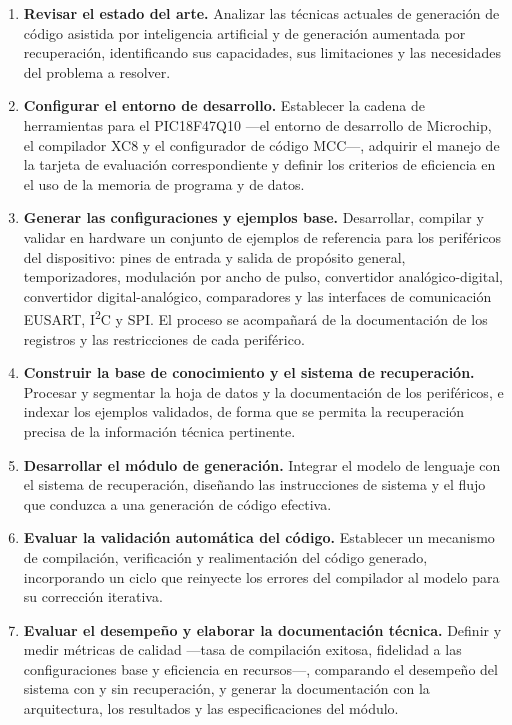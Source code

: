 \begin{enumerate}
  \item \textbf{Revisar el estado del arte.} Analizar las técnicas actuales de
        generación de código asistida por inteligencia artificial y de
        generación aumentada por recuperación, identificando sus capacidades,
        sus limitaciones y las necesidades del problema a resolver.

  \item \textbf{Configurar el entorno de desarrollo.} Establecer la cadena de
        herramientas para el PIC18F47Q10 —el entorno de desarrollo de Microchip,
        el compilador XC8 y el configurador de código MCC—, adquirir el manejo
        de la tarjeta de evaluación correspondiente y definir los criterios de
        eficiencia en el uso de la memoria de programa y de datos.

  \item \textbf{Generar las configuraciones y ejemplos base.} Desarrollar,
        compilar y validar en hardware un conjunto de ejemplos de referencia
        para los periféricos del dispositivo: pines de entrada y salida de
        propósito general, temporizadores, modulación por ancho de pulso,
        convertidor analógico-digital, convertidor digital-analógico,
        comparadores y las interfaces de comunicación EUSART,
        I\textsuperscript{2}C y SPI. El proceso se acompañará de la
        documentación de los registros y las restricciones de cada periférico.

  \item \textbf{Construir la base de conocimiento y el sistema de
        recuperación.} Procesar y segmentar la hoja de datos y la documentación
        de los periféricos, e indexar los ejemplos validados, de forma que se
        permita la recuperación precisa de la información técnica pertinente.

  \item \textbf{Desarrollar el módulo de generación.} Integrar el modelo de
        lenguaje con el sistema de recuperación, diseñando las instrucciones de
        sistema y el flujo que conduzca a una generación de código efectiva.

  \item \textbf{Evaluar la validación automática del código.} Establecer un
        mecanismo de compilación, verificación y realimentación del código
        generado, incorporando un ciclo que reinyecte los errores del compilador
        al modelo para su corrección iterativa.

  \item \textbf{Evaluar el desempeño y elaborar la documentación técnica.}
        Definir y medir métricas de calidad —tasa de compilación exitosa,
        fidelidad a las configuraciones base y eficiencia en recursos—,
        comparando el desempeño del sistema con y sin recuperación, y generar la
        documentación con la arquitectura, los resultados y las especificaciones
        del módulo.
\end{enumerate}

